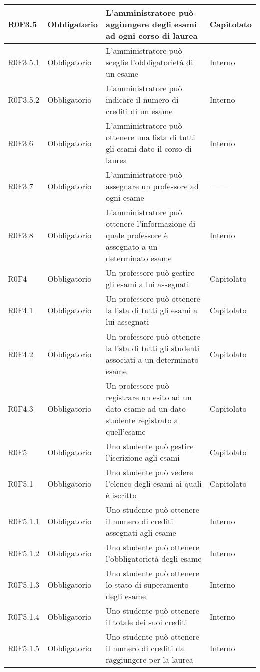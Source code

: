 \documentclass[AnalisiDeiRequisiti.tex]{subfiles}
\begin{document}
\begin{longtable}[H]{|p{2.5cm}|p{2.5cm}|p{5cm}|p{2cm}|}
	R0F3.5 & Obbligatorio & L'amministratore può aggiungere degli esami ad ogni corso di laurea & Capitolato \\ \hline
	R0F3.5.1 & Obbligatorio & L'amministratore può sceglie l'obbligatorietà di un esame & Interno \\ \hline
	R0F3.5.2 & Obbligatorio & L'amministratore può indicare il numero di crediti di un esame & Interno \\ \hline
	R0F3.6 & Obbligatorio & L'amministratore può ottenere una lista di tutti gli esami dato il corso di laurea & Interno \\ \hline
	R0F3.7 & Obbligatorio & L'amministratore può assegnare un professore ad ogni esame & -------- \\ \hline %
	R0F3.8 & Obbligatorio & L'amministratore può ottenere l'informazione di quale professore è assegnato a un determinato esame & Interno \\ \hline
	R0F4 & Obbligatorio & Un professore può gestire gli esami a lui assegnati & Capitolato \\ \hline
	R0F4.1 & Obbligatorio & Un professore può ottenere la lista di tutti gli esami a lui assegnati & Capitolato \\ \hline
	R0F4.2 & Obbligatorio & Un professore può ottenere la lista di tutti gli studenti associati a un determinato esame & Capitolato \\ \hline
	R0F4.3 & Obbligatorio & Un professore può registrare un esito ad un dato esame ad un dato studente registrato a quell'esame & Capitolato \\ \hline
	R0F5 & Obbligatorio & Uno studente può gestire l'iscrizione agli esami & Capitolato \\ \hline
	R0F5.1 & Obbligatorio & Uno studente può vedere l'elenco degli esami ai quali è iscritto & Capitolato \\ \hline
	R0F5.1.1 & Obbligatorio & Uno studente può ottenere il numero di crediti assegnati agli esame & Interno \\ \hline
	R0F5.1.2 & Obbligatorio & Uno studente può ottenere l'obbligatorietà degli esame & Interno \\ \hline
	R0F5.1.3 & Obbligatorio & Uno studente può ottenere lo stato di superamento degli esame & Interno \\ \hline
	R0F5.1.4 & Obbligatorio & Uno studente può ottenere il totale dei suoi crediti & Interno \\ \hline
	R0F5.1.5 & Obbligatorio & Uno studente può ottenere il numero di crediti da raggiungere per la laurea & Interno \\ \hline

\end{longtable}
\end{document}

